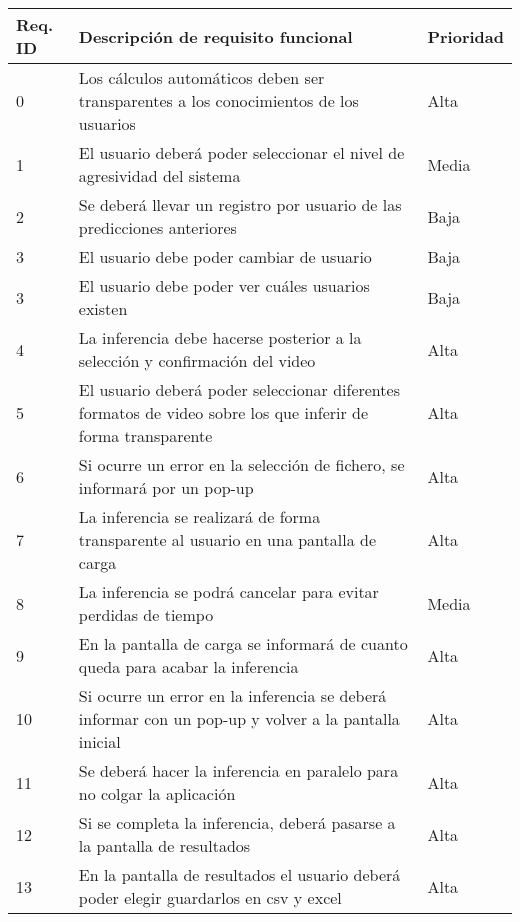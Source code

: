\begin{table}[H]
    \begin{center}
        \begin{tabular}{p{} | p{} p{}}
            Req. ID & Descripción de requisito funcional & Prioridad\\
            \hline
            0& Los cálculos automáticos deben ser transparentes a los conocimientos de los usuarios & Alta\\
            \hline
            1& El usuario deberá poder seleccionar el nivel de agresividad del sistema & Media\\
            \hline
            2& Se deberá llevar un registro por usuario de las predicciones anteriores & Baja\\
            \hline
            3& El usuario debe poder cambiar de usuario & Baja\\
            \hline
            3& El usuario debe poder ver cuáles usuarios existen & Baja\\
            \hline
            4& La inferencia debe hacerse posterior a la selección y confirmación del video & Alta\\
            \hline
            5& El usuario deberá poder seleccionar diferentes formatos de video sobre los que inferir de forma transparente & Alta\\
            \hline
            6& Si ocurre un error en la selección de fichero, se informará por un pop-up & Alta\\
            \hline
            7& La inferencia se realizará de forma transparente al usuario en una pantalla de carga & Alta\\
            \hline
            8& La inferencia se podrá cancelar para evitar perdidas de tiempo & Media\\
            \hline
            9& En la pantalla de carga se informará de cuanto queda para acabar la inferencia & Alta\\
            \hline
            10& Si ocurre un error en la inferencia se deberá informar con un pop-up y volver a la pantalla inicial & Alta\\
            \hline
            11& Se deberá hacer la inferencia en paralelo para no colgar la aplicación & Alta\\
            \hline
            12& Si se completa la inferencia, deberá pasarse a la pantalla de resultados & Alta\\
            \hline
            13& En la pantalla de resultados el usuario deberá poder elegir guardarlos en csv y excel & Alta\\

\end{tabular}
\end{center}
\end{table}
